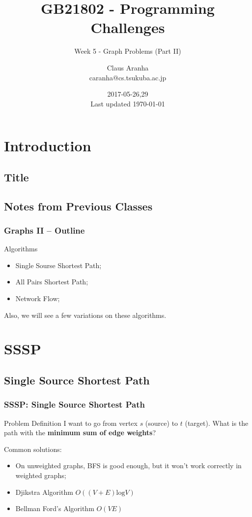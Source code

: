 \documentclass{beamer}
\title[GB21802]{GB21802 - Programming Challenges}
\subtitle[]{Week 5 - Graph Problems (Part II)}
\author[Claus Aranha]{Claus Aranha\\{\footnotesize caranha@cs.tsukuba.ac.jp}}
\institute{College of Information Science}
\date{2017-05-26,29\\{\tiny Last updated \today}}
\begin{document}
\section{Introduction}
\subsection{Title}
\begin{frame}
\maketitle
\end{frame}

\subsection{Notes from Previous Classes}



\begin{frame}
  \frametitle{Graphs II -- Outline}
  \begin{block}{Algorithms}
    \begin{itemize}
    \item Single Sourse Shortest Path;
    \item All Pairs Shortest Path;
    \item Network Flow;
    \end{itemize}
  \end{block}

  \bigskip

  Also, we will see a few variations on these algorithms.
\end{frame}

\section{SSSP}

\subsection{Single Source Shortest Path}
\begin{frame}
  \frametitle{SSSP: Single Source Shortest Path}
  \begin{block}{Problem Definition}
    I want to go from vertex $s$ (source) to $t$ (target). What is
    the path with the {\bf minimum sum of edge weights}?
  \end{block}
  
  \bigskip
  
  {\smaller
    Common solutions:
    
    \begin{itemize}
    \item On \alert{unweighted} graphs, BFS is good enough, but it
      won't work correctly in weighted graphs;
    \item Djikstra Algorithm $O((V+E)\text{log}V)$
    \item Bellman Ford's Algorithm $O(VE)$
    \end{itemize}
  }
\end{frame}
\end{document}
